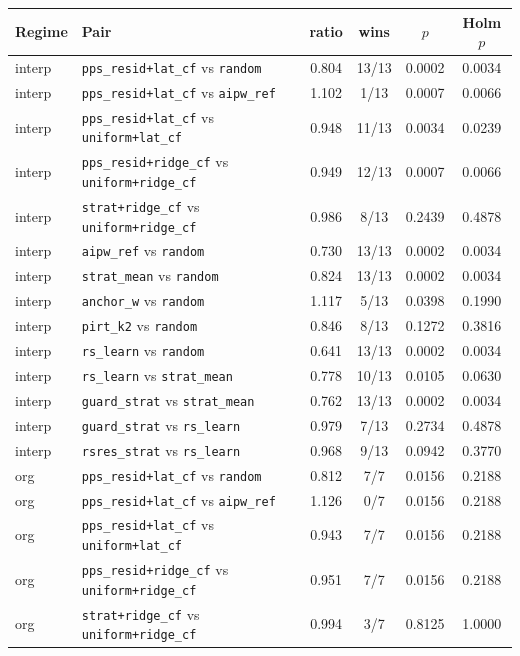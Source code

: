 \begin{tabular}{llcccc}
\toprule
Regime & Pair & ratio & wins & $p$ & Holm $p$\\
\midrule
interp & \texttt{pps\_resid+lat\_cf} vs \texttt{random} & 0.804 & 13/13 & 0.0002 & 0.0034 \\
interp & \texttt{pps\_resid+lat\_cf} vs \texttt{aipw\_ref} & 1.102 & 1/13 & 0.0007 & 0.0066 \\
interp & \texttt{pps\_resid+lat\_cf} vs \texttt{uniform+lat\_cf} & 0.948 & 11/13 & 0.0034 & 0.0239 \\
interp & \texttt{pps\_resid+ridge\_cf} vs \texttt{uniform+ridge\_cf} & 0.949 & 12/13 & 0.0007 & 0.0066 \\
interp & \texttt{strat+ridge\_cf} vs \texttt{uniform+ridge\_cf} & 0.986 & 8/13 & 0.2439 & 0.4878 \\
interp & \texttt{aipw\_ref} vs \texttt{random} & 0.730 & 13/13 & 0.0002 & 0.0034 \\
interp & \texttt{strat\_mean} vs \texttt{random} & 0.824 & 13/13 & 0.0002 & 0.0034 \\
interp & \texttt{anchor\_w} vs \texttt{random} & 1.117 & 5/13 & 0.0398 & 0.1990 \\
interp & \texttt{pirt\_k2} vs \texttt{random} & 0.846 & 8/13 & 0.1272 & 0.3816 \\
interp & \texttt{rs\_learn} vs \texttt{random} & 0.641 & 13/13 & 0.0002 & 0.0034 \\
interp & \texttt{rs\_learn} vs \texttt{strat\_mean} & 0.778 & 10/13 & 0.0105 & 0.0630 \\
interp & \texttt{guard\_strat} vs \texttt{strat\_mean} & 0.762 & 13/13 & 0.0002 & 0.0034 \\
interp & \texttt{guard\_strat} vs \texttt{rs\_learn} & 0.979 & 7/13 & 0.2734 & 0.4878 \\
interp & \texttt{rsres\_strat} vs \texttt{rs\_learn} & 0.968 & 9/13 & 0.0942 & 0.3770 \\
\midrule
org & \texttt{pps\_resid+lat\_cf} vs \texttt{random} & 0.812 & 7/7 & 0.0156 & 0.2188 \\
org & \texttt{pps\_resid+lat\_cf} vs \texttt{aipw\_ref} & 1.126 & 0/7 & 0.0156 & 0.2188 \\
org & \texttt{pps\_resid+lat\_cf} vs \texttt{uniform+lat\_cf} & 0.943 & 7/7 & 0.0156 & 0.2188 \\
org & \texttt{pps\_resid+ridge\_cf} vs \texttt{uniform+ridge\_cf} & 0.951 & 7/7 & 0.0156 & 0.2188 \\
org & \texttt{strat+ridge\_cf} vs \texttt{uniform+ridge\_cf} & 0.994 & 3/7 & 0.8125 & 1.0000 \\

\end{tabular}
